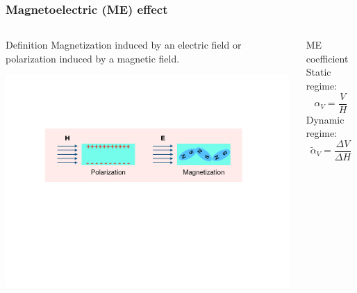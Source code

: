\documentclass[compress]{beamer}
\begin{document}
\begin{frame}\frametitle{Magnetoelectric (ME) effect}
\vspace{-10.5pt}
\begin{columns}[totalwidth=\textwidth] 
   \begin{column}{.73\textwidth}
   \begin{block}{Definition}
	Magnetization induced by an electric field or polarization induced by a magnetic field.
	\end{block} 
   \includegraphics[width=0.99\textwidth]{Graphic/01_illusmeeffect.pdf}
   \end{column}
   \begin{column}{.25\textwidth}
       \begin{exampleblock}{ME coefficient} 
       Static regime:
          \begin{equation*}
          \alpha_V = \frac{V}{H}
          \end{equation*}
       Dynamic regime:
          \begin{equation*}
          \tilde{\alpha}_V = \frac{\Delta V}{\Delta H}
          \end{equation*}
       \end{exampleblock}
   \end{column}
\end{columns}
\begin{columns}[totalwidth=\textwidth] 
   \begin{column}{.65\textwidth}

\end{column}
\end{columns}
\end{frame}
\end{document}
